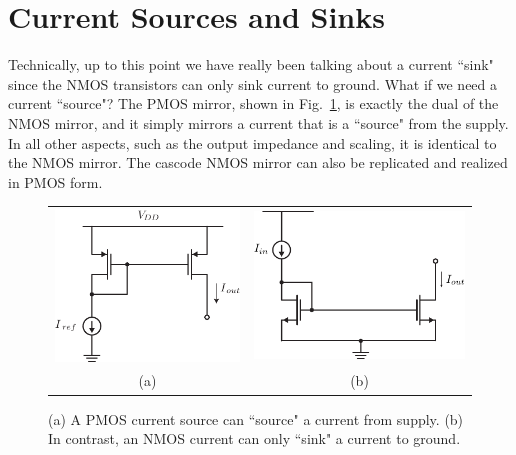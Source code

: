 \section{Current Sources and Sinks}
Technically, up to this point we have really been talking about a current ``sink" since the NMOS transistors can only sink current to ground.  What if we need a current ``source"?  The PMOS mirror, shown in Fig.~\ref{fig:18mirror_pmos.pdf}, is exactly the dual of the NMOS mirror, and it simply mirrors a current that is a ``source" from the supply.  In all other aspects, such as the output impedance and scaling, it is identical to the NMOS mirror.  The cascode NMOS mirror can also be replicated and realized in PMOS form. 
\begin{figure}[tb]
\centering
\begin{tabular}{cc}
\includegraphics[scale=1]{18mirror_pmos.pdf} &
\includegraphics[scale=1]{nmos_source_mirror}\\ 
(a) & (b)\\
\end{tabular}
\caption{(a) A PMOS current source can ``source" a current from supply.  (b) In contrast, an NMOS current can only ``sink" a current to ground.}
\label{fig:18mirror_pmos.pdf}
\end{figure}
